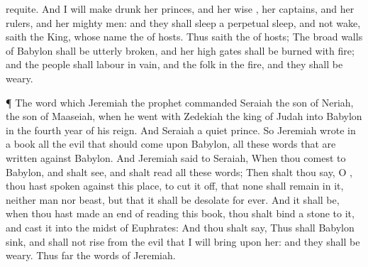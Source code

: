 {requite.
And I will make
drunk her
princes, and her
wise
{}, her
captains, and her
rulers, and her mighty
men: and they shall
sleep a
perpetual
sleep, and not
wake,
saith the
King, whose
name
{} the
{} of
hosts.
Thus
saith the
{} of
hosts; The
broad
walls of
Babylon shall be
utterly
broken, and her
high
gates shall be
burned with
fire; and the
people shall
labour in
vain, and the
folk
in the
fire, and they shall be
weary.
\par }{\PP {}¶ The
word which
Jeremiah the
prophet
commanded
Seraiah the
son of
Neriah, the
son of
Maaseiah, when he
went with
Zedekiah the
king of
Judah into
Babylon in the
fourth
year of his
reign. And
{}
Seraiah
{} a
quiet
prince.
So
Jeremiah
wrote in
a
book all the
evil that should
come upon
Babylon,
{} all these
words that are
written against
Babylon.
And
Jeremiah
said to
Seraiah, When thou
comest to
Babylon, and shalt
see, and shalt
read all these
words;
Then shalt thou
say, O
{}, thou hast
spoken against this
place, to cut it
off, that none shall
remain in it, neither
man nor
beast, but that it shall be
desolate for
ever.
And it shall be, when thou hast made an
end of
reading this
book,
{} thou shalt
bind a
stone to it, and
cast it into the
midst of
Euphrates:
And thou shalt
say, Thus shall
Babylon
sink, and shall not
rise
from the
evil that I will
bring upon her: and they shall be
weary. Thus far
{} the
words of
Jeremiah.

}
